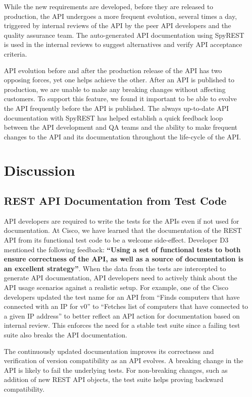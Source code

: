 \documentclass[10pt, conference]{IEEEtran}
\begin{document}
While the new requirements are developed, before they are released to production, the API undergoes a more frequent evolution, several times a day, triggered by internal reviews of the API by the peer API developers and the quality assurance team. The auto-generated API documentation using SpyREST is used in the internal reviews to suggest alternatives and verify API acceptance criteria.

API evolution before and after the production release of the API has two opposing forces, yet one helps achieve the other. After an API is published to production, we are unable to make any breaking changes without affecting customers. To support this feature, we found it important to be able to evolve the API frequently before the API is published. The always up-to-date API documentation with SpyREST has helped establish a quick feedback loop between the API development and QA teams and the ability to make frequent changes to the API and its documentation throughout the life-cycle of the API.


\section{Discussion}

\subsection{REST API Documentation from Test Code}
API developers are required to write the tests for the APIs even if not used for documentation. At Cisco, we have learned that the documentation of the REST API from its functional test code to be a welcome side-effect. Developer D3 mentioned the following feedback: \textbf{``Using a set of functional tests to both ensure correctness of the API, as well as a source of documentation is an excellent strategy''}. When the data from the tests are intercepted to generate API documentation, API developers need to actively think about the API usage scenarios against a realistic setup. For example, one of the Cisco developers updated the test name for an API from ``Finds computers that have connected with an IP for v0'' to ``Fetches list of computers that have connected to a given IP address'' to better reflect an API action for documentation based on internal review. This enforces the need for a stable test suite since a failing test suite also breaks the API documentation.

The continuously updated documentation improves its correctness and verification of version compatibility as an API evolves. A breaking change in the API is likely to fail the underlying tests. For non-breaking changes, such as addition of new REST API objects, the test suite helps proving backward compatibility.
\end{document}
